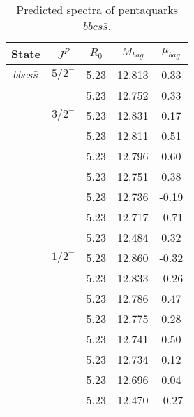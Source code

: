 \documentclass[prd,twocolumn,floatfix,nofootinbib]{revtex4}
\begin{document}
\renewcommand{\tabcolsep}{0.5cm}
\renewcommand{\arraystretch}{1.2}
\begin{table*}[!htbp]
    \caption{Predicted spectra of pentaquarks $bbcs\bar{s}$.}
    \begin{tabular}{ccccc}
        \hline\hline
        {\rm State} &$J^{P}$ &$R_{0}$ &$M_{bag}$ &$\mu_{bag}$ \\ \hline
        ${bbcs\bar{s}}$
            &${5/2}^{-}$    &5.23   &12.813 &0.33 \\
            &               &5.23   &12.752 &0.33 \\
            &${3/2}^{-}$    &5.23   &12.831 &0.17 \\
            &               &5.23   &12.811 &0.51 \\
            &               &5.23   &12.796 &0.60 \\
            &               &5.23   &12.751 &0.38 \\
            &               &5.23   &12.736 &-0.19 \\
            &               &5.23   &12.717 &-0.71 \\
            &               &5.23   &12.484 &0.32 \\
            &${1/2}^{-}$    &5.23   &12.860 &-0.32 \\
            &               &5.23   &12.833 &-0.26 \\
            &               &5.23   &12.786 &0.47 \\
            &               &5.23   &12.775 &0.28 \\
            &               &5.23   &12.741 &0.50 \\
            &               &5.23   &12.734 &0.12 \\
            &               &5.23   &12.696 &0.04 \\
            &               &5.23   &12.470 &-0.27 \\
        \hline\hline
    \end{tabular}
\end{table*}
\end{document}
